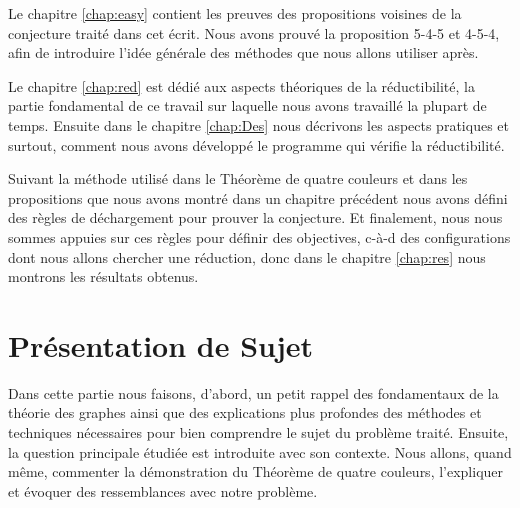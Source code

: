\documentclass[10pt,a4paper]{article}
\begin{document}
Le chapitre \ref{chap:easy} contient les preuves des propositions voisines de la conjecture traité dans cet écrit. Nous avons prouvé la proposition 5-4-5 et 4-5-4, afin de introduire l'idée générale des méthodes que nous allons utiliser après.  

Le chapitre \ref{chap:red} est dédié aux aspects théoriques de la réductibilité, la partie fondamental de ce travail sur laquelle nous avons travaillé la plupart de temps. Ensuite dans le chapitre \ref{chap:Des} nous décrivons les aspects pratiques et surtout, comment nous avons développé le programme qui vérifie la réductibilité.

Suivant la méthode utilisé dans le Théorème de quatre couleurs et dans les propositions que nous avons montré dans un chapitre précédent nous avons défini des règles de déchargement pour prouver la conjecture. Et finalement, nous nous sommes appuies sur ces règles pour définir des objectives, c-à-d des configurations dont nous allons chercher une réduction, donc dans le chapitre \ref{chap:res} nous montrons les résultats obtenus.



\section{Présentation de Sujet}
\label{chap:pres}

Dans cette partie nous faisons, d'abord, un petit rappel des fondamentaux de la théorie des graphes ainsi que des explications plus profondes des méthodes et techniques nécessaires pour bien comprendre le sujet du problème traité. 
Ensuite, la question principale étudiée est introduite avec son contexte.
Nous allons, quand même, commenter la démonstration du Théorème de quatre couleurs, l'expliquer et évoquer des ressemblances avec notre problème. 
\end{document}
